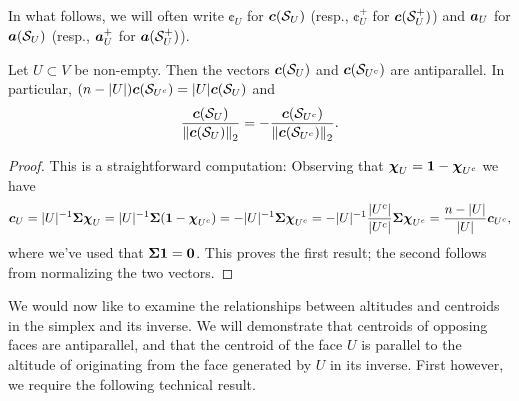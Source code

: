 In what follows,  we will often write $\cent_U$ for $\vb*{c}(\mathcal{S}_U)$ (resp., $\cent_U^+$ for $\vb*{c}(\mathcal{S}_U^+)$) and $\vb*{a}_U$ for $\vb*{a}(\mathcal{S}_U)$ (resp., $\vb*{a}_U^+$ for $\vb*{a}(\mathcal{S}_U^+)$). 

\begin{lemma}
\label{lem:complimentary_centroids}
Let $U\subset V$ be non-empty. Then the vectors $\vb*{c}(\mathcal{S}_U)$ and $\vb*{c}(\mathcal{S}_{U^c})$ are antiparallel. In particular, $(n-|U|)\vb*{c}(\mathcal{S}_{U^c}) = |U|\vb*{c}(\mathcal{S}_{U})$ and 
\[\frac{\vb*{c}(\mathcal{S}_U)}{\norm{\vb*{c}(\mathcal{S}_U)}_2}=-\frac{\vb*{c}(\mathcal{S}_{U^c})}{\norm{\vb*{c}(\mathcal{S}_{U^c})}_2}.\]
\end{lemma}
\begin{proof}
This is a straightforward computation: Observing that $\boldsymbol{\chi}_U=\vb{1}-\boldsymbol{\chi}_{U^c}$ we have  
\[\vb*{c}_U = |U|^{-1}\boldsymbol{\Sigma}\boldsymbol{\chi}_U = |U|^{-1}\boldsymbol{\Sigma}(\vb{1}-\boldsymbol{\chi}_{U^c})=-|U|^{-1}\boldsymbol{\Sigma}\boldsymbol{\chi}_{U^c}=-|U|^{-1}\frac{|U^c|}{|U^c|}\boldsymbol{\Sigma}\boldsymbol{\chi}_{U^c}=\frac{n-|U|}{|U|}\vb*{c}_{U^c},\]
where we've used that $\boldsymbol{\Sigma}\vb{1}=\vb{0}$. This proves the first result; the second follows from normalizing the two vectors.
\end{proof}

We would now like to examine the relationships between altitudes and centroids in the simplex and its inverse. We will demonstrate that centroids of opposing faces are antiparallel, and that the centroid of the face $U$ is parallel to the altitude of originating from the face generated by $U$ in its inverse. First however, we require the following technical result. 

